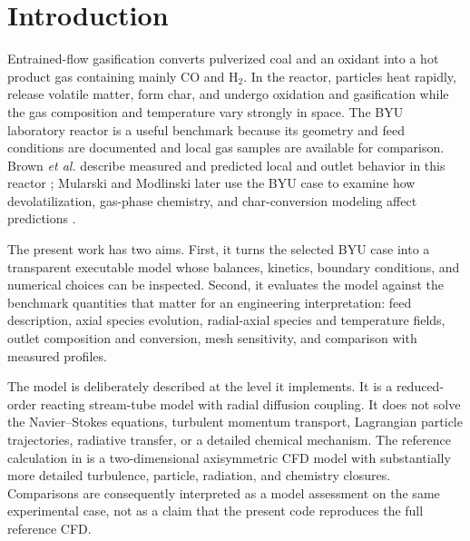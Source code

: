 \documentclass[journal]{IEEEtran}
\newcommand{\CO}{\mathrm{CO}}
\newcommand{\Htwo}{\mathrm{H_2}}
\begin{document}
\section{Introduction}
Entrained-flow gasification converts pulverized coal and an oxidant into a hot product gas containing mainly \(\CO\) and \(\Htwo\). In the reactor, particles heat rapidly, release volatile matter, form char, and undergo oxidation and gasification while the gas composition and temperature vary strongly in space. The BYU laboratory reactor is a useful benchmark because its geometry and feed conditions are documented and local gas samples are available for comparison. Brown \emph{et al.} describe measured and predicted local and outlet behavior in this reactor \cite{brown1988}; Mularski and Modlinski later use the BYU case to examine how devolatilization, gas-phase chemistry, and char-conversion modeling affect predictions \cite{mularski2021}.

The present work has two aims. First, it turns the selected BYU case into a transparent executable model whose balances, kinetics, boundary conditions, and numerical choices can be inspected. Second, it evaluates the model against the benchmark quantities that matter for an engineering interpretation: feed description, axial species evolution, radial-axial species and temperature fields, outlet composition and conversion, mesh sensitivity, and comparison with measured profiles.

The model is deliberately described at the level it implements. It is a reduced-order reacting stream-tube model with radial diffusion coupling. It does not solve the Navier--Stokes equations, turbulent momentum transport, Lagrangian particle trajectories, radiative transfer, or a detailed chemical mechanism. The reference calculation in \cite{mularski2021} is a two-dimensional axisymmetric CFD model with substantially more detailed turbulence, particle, radiation, and chemistry closures. Comparisons are consequently interpreted as a model assessment on the same experimental case, not as a claim that the present code reproduces the full reference CFD.
\end{document}
